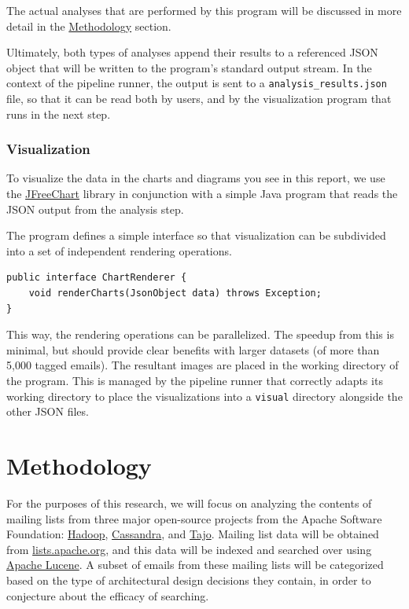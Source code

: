 \documentclass[a4paper, 12pt]{article}
\begin{document}
			The actual analyses that are performed by this program will be discussed in more detail in the \hyperref[sec:methodology]{Methodology} section.
		
			Ultimately, both types of analyses append their results to a referenced JSON object that will be written to the program's standard output stream. In the context of the pipeline runner, the output is sent to a \texttt{analysis\_results.json} file, so that it can be read both by users, and by the visualization program that runs in the next step.
			
		\newpage
		\subsubsection{Visualization}
			To visualize the data in the charts and diagrams you see in this report, we use the \href{https://www.jfree.org/jfreechart/}{JFreeChart} library in conjunction with a simple Java program that reads the JSON output from the analysis step.
			
			The program defines a simple interface so that visualization can be subdivided into a set of independent rendering operations.
			
			\begin{verbatim}
public interface ChartRenderer {
	void renderCharts(JsonObject data) throws Exception;
}
			\end{verbatim}
		
			This way, the rendering operations can be parallelized. The speedup from this is minimal, but should provide clear benefits with larger datasets (of more than 5,000 tagged emails). The resultant images are placed in the working directory of the program. This is managed by the pipeline runner that correctly adapts its working directory to place the visualizations into a \texttt{visual} directory alongside the other JSON files.

\section{Methodology}
	\label{sec:methodology}
	For the purposes of this research, we will focus on analyzing the contents of mailing lists from three major open-source projects from the Apache Software Foundation: \href{https://hadoop.apache.org/}{Hadoop}, \href{https://cassandra.apache.org}{Cassandra}, and \href{https://attic.apache.org/projects/tajo.html}{Tajo}. Mailing list data will be obtained from \href{https://lists.apache.org/}{lists.apache.org}, and this data will be indexed and searched over using \href{https://lucene.apache.org/}{Apache Lucene}. A subset of emails from these mailing lists will be categorized based on the type of architectural design decisions they contain, in order to conjecture about the efficacy of searching.
	
\end{document}
